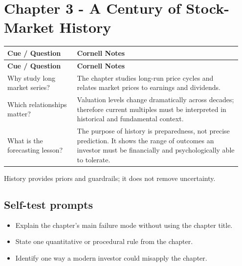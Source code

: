 \documentclass[11pt]{article}
\begin{document}
\section{Chapter 3 - A Century of Stock-Market History}
\begin{longtable}{@{}>{\raggedright\arraybackslash}p{0.29\linewidth}>{\raggedright\arraybackslash}p{0.66\linewidth}@{}}\toprule\textbf{Cue / Question} & \textbf{Cornell Notes}\\\midrule\endfirsthead\toprule\textbf{Cue / Question} & \textbf{Cornell Notes}\\\midrule\endhead
Why study long market series? & The chapter studies long-run price cycles and relates market prices to earnings and dividends. \\
Which relationships matter? & Valuation levels change dramatically across decades; therefore current multiples must be interpreted in historical and fundamental context. \\
What is the forecasting lesson? & The purpose of history is preparedness, not precise prediction. It shows the range of outcomes an investor must be financially and psychologically able to tolerate. \\
\bottomrule\end{longtable}
\begin{principlebox}History provides priors and guardrails; it does not remove uncertainty.\end{principlebox}
\subsection*{Self-test prompts}\begin{itemize}\item Explain the chapter's main failure mode without using the chapter title.\item State one quantitative or procedural rule from the chapter.\item Identify one way a modern investor could misapply the chapter.\end{itemize}
\end{document}
